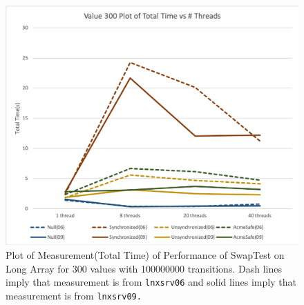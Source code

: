 \begin{figure}
\includegraphics[scale=0.45]{totaltime-value300.png}
\caption{\label{fig:vectors} Plot of Measurement(Total Time) of Performance of SwapTest on Long Array for 300 values with 100000000 transitions. Dash lines imply that measurement is from \texttt{lnxsrv06} and solid lines imply that measurement is from \texttt{lnxsrv09.} }
\end{figure}

